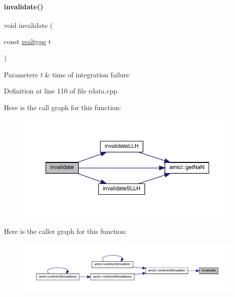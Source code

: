 \paragraph{\texorpdfstring{invalidate()}{invalidate()}}
{\footnotesize\ttfamily void invalidate (\begin{DoxyParamCaption}\item[{const \mbox{\hyperlink{namespaceamici_a1bdce28051d6a53868f7ccbf5f2c14a3}{realtype}}}]{t }\end{DoxyParamCaption})}


\begin{DoxyParams}{Parameters}
{\em t} & time of integration failure \\
\hline
\end{DoxyParams}


Definition at line 110 of file rdata.\+cpp.

Here is the call graph for this function\+:
\nopagebreak
\begin{figure}[H]
\begin{center}
\leavevmode
\includegraphics[width=350pt]{classamici_1_1_return_data_ab320e46748c17908f0bd4bba240b8e92_cgraph}
\end{center}
\end{figure}
Here is the caller graph for this function\+:
\nopagebreak
\begin{figure}[H]
\begin{center}
\leavevmode
\includegraphics[width=350pt]{classamici_1_1_return_data_ab320e46748c17908f0bd4bba240b8e92_icgraph}
\end{center}
\end{figure}
\mbox{\label{classamici_1_1_return_data_adce202dc864a1e65d8453f597de271f5}} 
